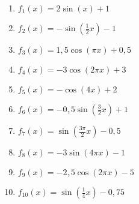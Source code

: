 \begin{Answer}[ref=allgSinCosA2]
	\begin{enumerate}[label=\alph*)]
		\item \(f_1(x)=2\sin\left(x\right)+1\)
		\item \(f_2(x)=-\sin\left(\frac{1}{2}x\right)-1\)
		\item \(f_3(x)=1,5\cos\left(\pi x\right)+0,5\)
		\item \(f_4(x)=-3\cos\left(2\pi x\right)+3\)
		\item \(f_5(x)=-\cos\left(4x\right)+2\)
		\item \(f_6(x)=-0,5\sin\left(\frac{3}{2}x\right)+1\)
		\item \(f_7(x)=\sin\left(\frac{3\pi}{2}x\right)-0,5\)
		\item \(f_8(x)=-3\sin\left(4\pi x\right)-1\)
		\item \(f_9(x)=-2,5\cos\left(2\pi x\right)-5\)
		\item \(f_{10}(x)=\sin\left(\frac{1}{4} x\right)-0,75\)
	\end{enumerate}
\end{Answer}